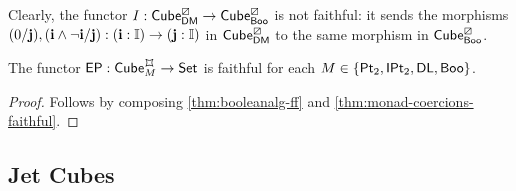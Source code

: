 \documentclass[a4paper]{memoir}
\begin{document}
Clearly, the functor $I : {\mathsf{Cube}}_{\mathsf{DM}}^\boxslash \to {\mathsf{Cube}}_{\mathsf{Boo}}^\boxslash$ is not faithful: it sends the morphisms $(0/\mathbf{j}), (\mathbf{i} \wedge \lnot \mathbf{i}/\mathbf{j}) : (\mathbf{i} : {\mathbb I}) \to (\mathbf{j} : {\mathbb I})$ in ${\mathsf{Cube}}_{\mathsf{DM}}^\boxslash$ to the same morphism in ${\mathsf{Cube}}_{\mathsf{Boo}}^\boxslash$.
\begin{corollary} \label{thm:monads-faithful}
	The functor $\EP : \cubecat^\mycubex_M \to \Set$ is faithful for each $M \in \mathopen{}\left\{ {\mathsf{Pt}_2}, {\mathsf{IPt}_2}, \mathsf{DL}, \mathsf{Boo} \right\}\mathclose{}$.
\end{corollary}
\begin{proof}
	Follows by composing \cref{thm:booleanalg-ff} and \cref{thm:monad-coercions-faithful}.
\end{proof}

\subsection{Jet Cubes} \label{sec:jetcubes:def}
\end{document}
